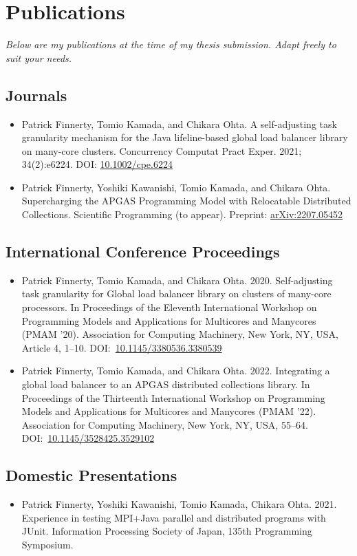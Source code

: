 \chapter*{Publications}

\textit{Below are my publications at the time of my thesis submission. Adapt freely to suit your needs.}

\section*{Journals}
\begin{itemize}
	\item Patrick Finnerty, Tomio Kamada, and Chikara Ohta. A self-adjusting task granularity mechanism for the Java lifeline-based global load balancer library on many-core clusters. Concurrency Computat Pract Exper. 2021; 34(2):e6224. DOI: \href{https://doi.org/10.1002/cpe.6224}{10.1002/cpe.6224}
	\item Patrick Finnerty, Yoshiki Kawanishi, Tomio Kamada, and Chikara Ohta. Supercharging the APGAS Programming Model with Relocatable Distributed Collections. Scientific Programming (to appear). Preprint: \href{https://doi.org/10.48550/arXiv.2207.05452}{arXiv:2207.05452}
\end{itemize}

\section*{International Conference Proceedings}
\begin{itemize}
	\item Patrick Finnerty, Tomio Kamada, and Chikara Ohta. 2020. Self-adjusting task granularity for Global load balancer library on clusters of many-core processors. In Proceedings of the Eleventh International Workshop on Programming Models and Applications for Multicores and Manycores (PMAM '20). Association for Computing Machinery, New York, NY, USA, Article 4, 1–10. DOI:~\href{https://doi.org/10.1145/3380536.3380539}{10.1145/3380536.3380539}
	\item Patrick Finnerty, Tomio Kamada, and Chikara Ohta. 2022. Integrating a global load balancer to an APGAS distributed collections library. In Proceedings of the Thirteenth International Workshop on Programming Models and Applications for Multicores and Manycores (PMAM '22). Association for Computing Machinery, New York, NY, USA, 55–64. DOI:~\href{https://doi.org/10.1145/3528425.3529102}{10.1145/3528425.3529102}
\end{itemize}

\section*{Domestic Presentations}
\begin{itemize}
	\item Patrick Finnerty, Yoshiki Kawanishi, Tomio Kamada, Chikara Ohta. 2021. Experience in testing MPI+Java parallel and distributed programs with JUnit. Information Processing Society of Japan, 135th Programming Symposium.
\end{itemize}